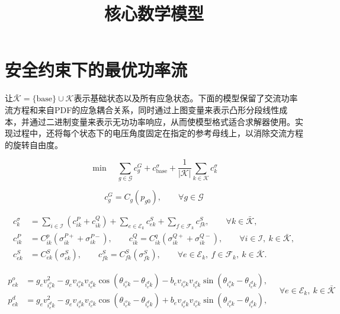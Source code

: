 \documentclass{article}
\title{核心数学模型}
\date{}
\begin{document}
\maketitle

\section*{安全约束下的最优功率流}

让$\bar{\mathcal{K}} = \{\text{base}\} \cup \mathcal{K}$表示基础状态以及所有应急状态。下面的模型保留了交流功率流方程和来自PDF的应急耦合关系，同时通过上图变量来表示凸形分段线性成本，并通过二进制变量来表示无功功率响应，从而使模型格式适合求解器使用。实现过程中，还将每个状态下的电压角度固定在指定的参考母线上，以消除交流方程的旋转自由度。

\begin{equation}
\min \quad
\sum_{g \in \mathcal{G}} c_g^G
+ c_{\text{base}}^\sigma
+ \frac{1}{|\mathcal{K}|} \sum_{k \in \mathcal{K}} c_k^\sigma
\tag{2.1a}
\end{equation}

\begin{equation}
c_g^G = C_g(p_{g0}),
\qquad \forall g \in \mathcal{G}
\tag{2.1a$'$}
\end{equation}

\begin{equation}
\begin{aligned}
c_k^\sigma &=
\sum_{i \in \mathcal{I}}
\left(
c_{ik}^{P} + c_{ik}^{Q}
\right)
+ \sum_{e \in \mathcal{E}_k} c_{ek}^{S}
+ \sum_{f \in \mathcal{F}_k} c_{fk}^{S},
\qquad \forall k \in \bar{\mathcal{K}}, \\
c_{ik}^{P} &= C_{ik}^{p}(\sigma_{ik}^{P+} + \sigma_{ik}^{P-}),
\qquad
c_{ik}^{Q} = C_{ik}^{q}(\sigma_{ik}^{Q+} + \sigma_{ik}^{Q-}),
\qquad \forall i \in \mathcal{I},\ k \in \bar{\mathcal{K}}, \\
c_{ek}^{S} &= C_{ek}^{S}(\sigma_{ek}^{S}),
\qquad
c_{fk}^{S} = C_{fk}^{S}(\sigma_{fk}^{S}),
\qquad \forall e \in \mathcal{E}_k,\ f \in \mathcal{F}_k,\ k \in \bar{\mathcal{K}}.
\end{aligned}
\tag{2.1b}
\end{equation}

\begin{equation}
\begin{aligned}
p_{ek}^o &=
g_e v_{i_e^o k}^2
- g_e v_{i_e^o k} v_{i_e^d k} \cos(\theta_{i_e^o k} - \theta_{i_e^d k})
- b_e v_{i_e^o k} v_{i_e^d k} \sin(\theta_{i_e^o k} - \theta_{i_e^d k}), \\
p_{ek}^d &=
g_e v_{i_e^d k}^2
- g_e v_{i_e^d k} v_{i_e^o k} \cos(\theta_{i_e^o k} - \theta_{i_e^d k})
+ b_e v_{i_e^d k} v_{i_e^o k} \sin(\theta_{i_e^o k} - \theta_{i_e^d k}),
\end{aligned}
\quad \forall e \in \mathcal{E}_k,\ k \in \bar{\mathcal{K}}
\tag{2.1c}
\end{equation}
\end{document}
